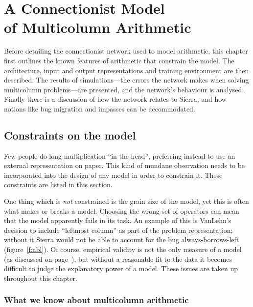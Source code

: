 %

\chapter[A connectionist model of multicolumn arithmetic]{A
Connectionist Model\\of Multicolumn Arithmetic}\label{c:fsm}

Before detailing the connectionist network used to model
arithmetic, this chapter first outlines the known features of arithmetic
that constrain the model.
The architecture, input and output
representations and training environment are then described.  The results
of simulations---the errors the network makes when solving multicolumn
problems---are presented, and the network's behaviour is
analysed.  Finally there is a discussion of how the network relates to
Sierra, and how notions like bug migration and impasses can be
accommodated.


\section{Constraints on the model}

Few people do long multiplication ``in the head'', preferring instead to
use an external representation on paper.  This kind of mundane
observation needs to be incorporated into the design of any model in order
to constrain it.  These constraints are listed in this section.

One thing which is {\em not\/} constrained is the grain size of the model,
yet this is often what makes or breaks a model.  Choosing the wrong
set of operators can mean that the model apparently fails in its task.  An
example of this is VanLehn's decision to include ``leftmost column'' as
part of the problem representation; without it Sierra would not be able to
account for the bug always-borrows-left (figure~\ref{f:abl}). Of course,
empirical validity is not the only measure of a model (as discussed on
page~\pageref{p:empirical}), but without a reasonable fit to the data it
becomes difficult to judge the explanatory power of a model.  These issues
are taken up throughout this chapter.

\subsection{What we know about multicolumn arithmetic}

